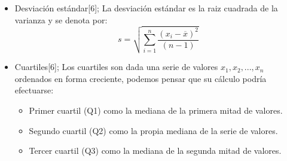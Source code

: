 \begin{itemize}
	  \item Desviaci\'on est\'andar[6]; La desviaci\'on est\'andar es la raiz cuadrada de la varianza y se denota por:
	 $$s=\sqrt{\sum_{i=1}^{n} \frac{ \left( x_{i}-\overline{x}\right)^{2}}{\left(n-1 \right) } }$$ 
	 
	 \item Cuartiles[6]; Los cuartiles son dada una serie de valores  $x_{1},x_{2},...,x_{n}$ ordenados en forma creciente, podemos pensar que su cálculo podría efectuarse:
		 \begin{itemize}
		 	\item Primer cuartil (Q1) como la mediana de la primera mitad de valores.
		 	\item Segundo cuartil (Q2) como la propia mediana de la serie de valores.
		 	\item Tercer cuartil (Q3) como la mediana de la segunda mitad de valores.
		\end{itemize}
	\end{itemize}  
